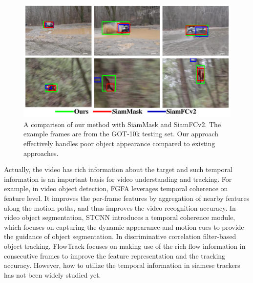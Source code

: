 \begin{figure}[t]
    \centering
    \includegraphics[width=1.0\textwidth]{Img/end/visulization.pdf}
    \caption{A comparison of our method with SiamMask and SiamFCv2. The example frames are from the GOT-10k testing set. Our approach effectively handles poor object appearance compared to existing approaches.}
    \label{fig:visulization}
\end{figure}

Actually, the video has rich information about the target and such temporal information is an important basis for video understanding and tracking.
For example, in video object detection, FGFA \cite{zhu2017flow} leverages temporal coherence on feature level. It improves the per-frame features by aggregation of nearby features along the motion paths, and thus improves the video recognition accuracy.
In video object segmentation, STCNN \cite{xu2019spatiotemporal} introduces a temporal coherence module, which focuses on capturing the dynamic appearance and motion cues to provide the guidance of object segmentation.
In discriminative correlation filter-based object tracking, FlowTrack \cite{zhu2018end} focuses on making use of the rich flow information in consecutive frames to improve the feature representation and the tracking accuracy. 
However, how to utilize the temporal information in siamese trackers has not been widely studied yet. 

